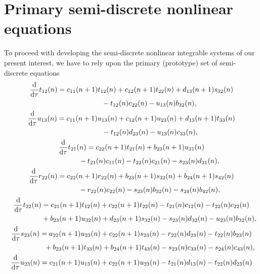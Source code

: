 \documentclass[10pt,a4paper]{amsart}
\numberwithin{equation}{section}
\begin{document}
\section{Primary semi-discrete nonlinear equations}

To proceed with developing the semi-discrete nonlinear integrable systems of our present interest, we have to
rely upon the primary (prototype) set of semi-discrete equations
\begin{gather}
	\frac{\mathrm{d}}{\mathrm{d}\tau}t_{12}(n)=c_{11}(n+1)t_{12}(n)+c_{12}(n+1)t_{22}(n)+d_{13}(n+1)s_{32}(n)\nonumber\\
\hphantom{\frac{\mathrm{d}}{\mathrm{d}\tau}t_{12}(n)=}{}
	-t_{12}(n)c_{22}(n)-u_{13}(n)b_{32}(n),\label{eq-3.1}
\\
	\frac{\mathrm{d}}{\mathrm{d}\tau}u_{13}(n)=c_{11}(n+1)u_{13}(n)+c_{12}(n+1)u_{23}(n)+d_{13}(n+1)t_{33}(n)\nonumber\\
\hphantom{\frac{\mathrm{d}}{\mathrm{d}\tau}u_{13}(n)=}{}
	-t_{12}(n)d_{23}(n)-u_{13}(n)c_{33}(n),\label{eq-3.2}
\\
	\frac{\mathrm{d}}{\mathrm{d}\tau}t_{21}(n)=c_{22}(n+1)t_{21}(n)+b_{23}(n+1)u_{31}(n)\nonumber\\
\hphantom{\frac{\mathrm{d}}{\mathrm{d}\tau}t_{21}(n)=}{}
	-t_{21}(n)c_{11}(n)-t_{22}(n)c_{21}(n)-s_{23}(n)d_{31}(n),\label{eq-3.3}
\\
	\frac{\mathrm{d}}{\mathrm{d}\tau}r_{22}(n)=c_{22}(n+1)r_{22}(n)+b_{23}(n+1)s_{32}(n)+b_{24}(n+1)s_{42}(n) \nonumber\\
\hphantom{\frac{\mathrm{d}}{\mathrm{d}\tau}r_{22}(n)=}{}
-r_{22}(n)c_{22}(n)-s_{23}(n)b_{32}(n)-s_{24}(n)b_{42}(n),\label{eq-3.4}
\\
	\frac{\mathrm{d}}{\mathrm{d}\tau}t_{22}(n)=c_{21}(n+1)t_{12}(n)+c_{22}(n+1)t_{22}(n)-t_{21}(n)c_{12}(n)-t_{22}(n)c_{22}(n) \nonumber\\
\hphantom{\frac{\mathrm{d}}{\mathrm{d}\tau}t_{22}(n)=}{}
	+b_{23}(n+1)u_{32}(n)+d_{23}(n+1)s_{32}(n)-s_{23}(n)d_{32}(n)-u_{23}(n)b_{32}(n),\label{eq-3.5}
\\
	\frac{\mathrm{d}}{\mathrm{d}\tau}s_{23}(n)=a_{22}(n+1)u_{23}(n)+c_{22}(n+1)s_{23}(n)-r_{22}(n)d_{23}(n)-t_{22}(n)b_{23}(n) \nonumber\\
\hphantom{\frac{\mathrm{d}}{\mathrm{d}\tau}s_{23}(n)=}{}
	+b_{23}(n+1)t_{33}(n)+b_{24}(n+1)t_{43}(n)-s_{23}(n)c_{33}(n)-s_{24}(n)c_{43}(n),\label{eq-3.6}
\\
	\frac{\mathrm{d}}{\mathrm{d}\tau}u_{23}(n)=c_{21}(n+1)u_{13}(n)+c_{22}(n+1)u_{23}(n)-t_{21}(n)d_{13}(n)-t_{22}(n)d_{23}(n) \nonumber\\

\end{gather}
\end{document}
